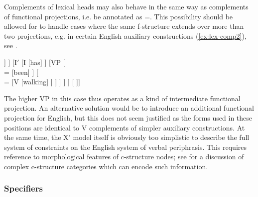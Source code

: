 \documentclass[output=paper,hidelinks]{langscibook}
\begin{document}
 Complements of lexical heads may also behave in the same way as complements of functional projections, i.e. be annotated as \UP=\DOWN. This possibility should be allowed for to handle cases where the same f-structure extends over more than two projections, e.g. in certain English auxiliary constructions (\ref{ex:lex-comp2}), see \textcite[111]{BresnanEtAl2016}.
 
 \ea\label{ex:lex-comp2}
 \begin{forest} %
  [,phantom,s sep+=2cm
  [IP,baseline
    [NP
        [N
            [John]
        ]
    ]
    [I$'$
        [I
            [has]
        ]
        [VP
            [{\\\UP=\DOWN}
                [been]
            ]
            [{\\\UP=\DOWN}
                [V
                    [walking]
                ]
            ]
        ]
    ]
  ]
  [\mbox{}
  ]]
 \end{forest}
 \z
 The higher VP in this case thus operates as a kind of intermediate functional projection. An alternative solution would be to introduce an additional functional projection for English, but this does not seem justified as the forms used in these positions are identical to V complements of simpler auxiliary constructions. At the same time, the X$'$ model itself is obviously too simplistic to describe the full system of constraints on the English system of verbal periphrasis. This requires reference to morphological features of c-structure nodes; see
 for a discussion of complex c-structure categories which can encode such information.
   
 \subsubsection{Specifiers}
 
\end{document}
